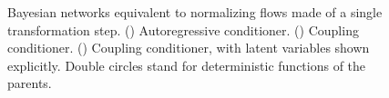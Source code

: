 \begin{figure}
\begin{subfigure}{.5\textwidth}
        \caption{} \label{fig:mono-step-flows-c}
    \end{subfigure}
    \caption{Bayesian networks equivalent to normalizing flows made of a single transformation step. () Autoregressive conditioner. () Coupling conditioner. () Coupling conditioner, with latent variables  shown explicitly. Double circles stand for deterministic functions of the parents.} \label{fig:mono-step-flows}
\end{figure}


